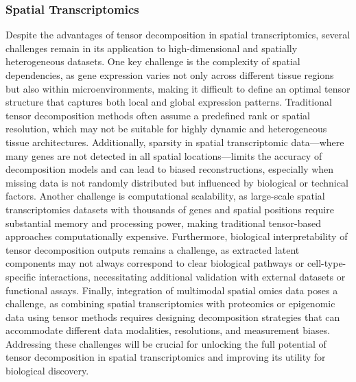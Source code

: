 
\subsubsection{Spatial Transcriptomics}
Despite the advantages of tensor decomposition in spatial transcriptomics, several challenges remain in its application to high-dimensional and spatially heterogeneous datasets. One key challenge is the complexity of spatial dependencies, as gene expression varies not only across different tissue regions but also within microenvironments, making it difficult to define an optimal tensor structure that captures both local and global expression patterns. Traditional tensor decomposition methods often assume a predefined rank or spatial resolution, which may not be suitable for highly dynamic and heterogeneous tissue architectures. Additionally, sparsity in spatial transcriptomic data—where many genes are not detected in all spatial locations—limits the accuracy of decomposition models and can lead to biased reconstructions, especially when missing data is not randomly distributed but influenced by biological or technical factors. Another challenge is computational scalability, as large-scale spatial transcriptomics datasets with thousands of genes and spatial positions require substantial memory and processing power, making traditional tensor-based approaches computationally expensive. Furthermore, biological interpretability of tensor decomposition outputs remains a challenge, as extracted latent components may not always correspond to clear biological pathways or cell-type-specific interactions, necessitating additional validation with external datasets or functional assays. Finally, integration of multimodal spatial omics data poses a challenge, as combining spatial transcriptomics with proteomics or epigenomic data using tensor methods requires designing decomposition strategies that can accommodate different data modalities, resolutions, and measurement biases. Addressing these challenges will be crucial for unlocking the full potential of tensor decomposition in spatial transcriptomics and improving its utility for biological discovery.

